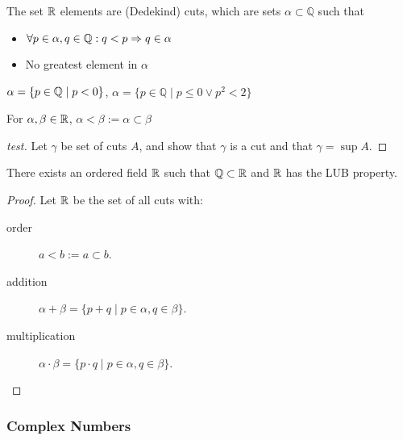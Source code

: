 \begin{definition}
	The set $\mathbb{R}$ elements are (Dedekind) cuts, which are sets $\alpha\subset\mathbb{Q}$ such that
	\begin{itemize}
		\item $\forall p\in  \alpha, q \in \mathbb{Q}:q<p \Rightarrow q \in \alpha$
		\item No greatest element in $\alpha$
	\end{itemize}
	\begin{example}
		$\alpha=\{p \in \mathbb{Q} \mid p < 0 \} $, $\alpha=\{ {p\in\mathbb{Q}\mid p\leq0\lor p^2<2}\}$
	\end{example}
\end{definition}

\begin{definition}
	\label{def:order_of_cuts}
	For $\alpha,\beta \in \mathbb{R}$, $\alpha<\beta:=\alpha\subset\beta$
\end{definition}
\begin{proof}[test]
	Let $\gamma$ be set of cuts $A$, and show that $\gamma$ is a cut and that $\gamma=\sup A$.
\end{proof}

\begin{theorem}
	There exists an ordered field $\mathbb{R} $ such that $\mathbb{Q} \subset \mathbb{R}$ and $\mathbb{R}$ has the LUB property.
	\begin{proof}
		Let $\mathbb{R}$ be the set of all cuts with:
		\begin{description}
			\item[order] $a<b:=a \subset b$.
			\item[addition] $\alpha+\beta=\{p+q\mid p\in \alpha, q\in \beta\}$.
			\item [multiplication] $\alpha\cdot\beta=\{p\cdot q\mid p\in \alpha, q\in \beta\}$.
		\end{description}
	\end{proof}
\end{theorem}

\subsubsection{Complex Numbers}

